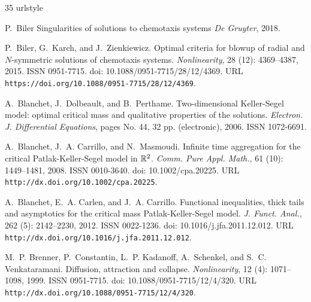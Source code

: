\documentclass[11pt]{aims}
\theoremstyle{definition}
\numberwithin{equation}{section}
\begin{document}
\def\cprime{$'$}
\begin{thebibliography}{35}
\providecommand{\natexlab}[1]{#1}
\providecommand{\url}[1]{\texttt{#1}}
\expandafter\ifx\csname urlstyle\endcsname\relax
  \providecommand{\doi}[1]{doi: #1}\else
  \providecommand{\doi}{doi: \begingroup \urlstyle{rm}\Url}\fi


P.~Biler
\newblock Singularities of solutions to chemotaxis systems
\newblock \emph{De Gruyter}, 2018.



P.~Biler, G.~Karch, and J.~Zienkiewicz.
\newblock Optimal criteria for blowup of radial and {$N$}-symmetric solutions
  of chemotaxis systems.
\newblock \emph{Nonlinearity}, 28 (12): 4369--4387, 2015.
\newblock ISSN 0951-7715.
\newblock \doi{10.1088/0951-7715/28/12/4369}.
\newblock URL \url{https://doi.org/10.1088/0951-7715/28/12/4369}.

A.~Blanchet, J.~Dolbeault, and B.~Perthame.
\newblock Two-dimensional {K}eller-{S}egel model: optimal critical mass and
  qualitative properties of the solutions.
\newblock \emph{Electron. J. Differential Equations}, pages No. 44, 32 pp.
  (electronic), 2006.
\newblock ISSN 1072-6691.

A.~Blanchet, J.~A. Carrillo, and N.~Masmoudi.
\newblock Infinite time aggregation for the critical {P}atlak-{K}eller-{S}egel
  model in {$\Bbb R^2$}.
\newblock \emph{Comm. Pure Appl. Math.}, 61 (10): 1449--1481,
  2008.
\newblock ISSN 0010-3640.
\newblock \doi{10.1002/cpa.20225}.
\newblock URL \url{http://dx.doi.org/10.1002/cpa.20225}.

A.~Blanchet, E.~A. Carlen, and J.~A. Carrillo.
\newblock Functional inequalities, thick tails and asymptotics for the critical
  mass {P}atlak-{K}eller-{S}egel model.
\newblock \emph{J. Funct. Anal.}, 262 (5): 2142--2230, 2012.
\newblock ISSN 0022-1236.
\newblock \doi{10.1016/j.jfa.2011.12.012}.
\newblock URL \url{http://dx.doi.org/10.1016/j.jfa.2011.12.012}.

M.~P. Brenner, P.~Constantin, L.~P. Kadanoff, A.~Schenkel, and S.~C.
  Venkataramani.
\newblock Diffusion, attraction and collapse.
\newblock \emph{Nonlinearity}, 12 (4): 1071--1098, 1999.
\newblock ISSN 0951-7715.
\newblock \doi{10.1088/0951-7715/12/4/320}.
\newblock URL \url{http://dx.doi.org/10.1088/0951-7715/12/4/320}.


\end{thebibliography}
\end{document}
